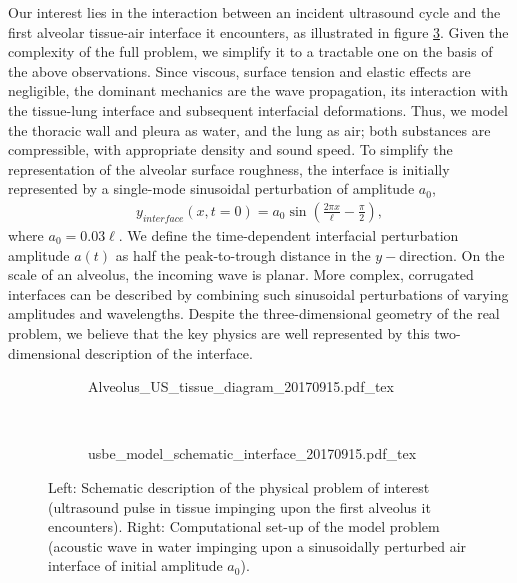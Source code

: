 Our interest lies in the interaction between an incident ultrasound
cycle and the first alveolar tissue-air interface it encounters, as
illustrated in figure \ref{fig:schematics}.  Given the complexity of
the full problem, we simplify it to a tractable one on the basis of
the above observations. Since viscous, surface tension and elastic
effects are negligible, the dominant mechanics are the wave
propagation, its interaction with the tissue-lung interface and
subsequent interfacial deformations. Thus, we model the thoracic wall
and pleura as water, and the lung as air; both substances are
compressible, with appropriate density and sound speed.  To simplify
the representation of the alveolar surface roughness, the interface is
initially represented by a single-mode sinusoidal perturbation of
amplitude $a_0$,
\begin{align}
  y_{interface}(x,t=0) = a_0\sin\left(\frac{2\pi x}{\ell}-\frac{\pi}{2}\right),
\end{align}
where $a_0=0.03\ell$.  We define the time-dependent interfacial
perturbation amplitude $a(t)$ as half the peak-to-trough distance in
the $y-$direction. On the scale of an alveolus, the incoming wave is
planar.  More complex, corrugated interfaces can be described by
combining such sinusoidal perturbations of varying amplitudes and
wavelengths.  Despite the three-dimensional geometry of the real
problem, we believe that the key physics are well represented by this
two-dimensional description of the interface.


% 
\begin{figure}
  \centering
  \begin{subfigure}[b]{0.48\textwidth}
    \centering
    \def\svgwidth{\textwidth}
    {Alveolus_US_tissue_diagram_20170915.pdf_tex} \hfill%
    \label{fig:alveolar_schematic}%
  \end{subfigure}
  ~
  \begin{subfigure}[b]{0.48\textwidth}
    \centering
    \def\svgwidth{\textwidth}
    {usbe_model_schematic_interface_20170915.pdf_tex} \hfill%
    \label{fig:problem_schematic}%
  \end{subfigure}
  \caption[Schematic view of the physical and model problems]{Left:
    Schematic description of the physical problem of interest
    (ultrasound pulse in tissue impinging upon the first alveolus it
    encounters). Right: Computational set-up of the model problem
    (acoustic wave in water impinging upon a sinusoidally perturbed
    air interface of initial amplitude $a_0$).}
  \label{fig:schematics}
\end{figure}
% 


